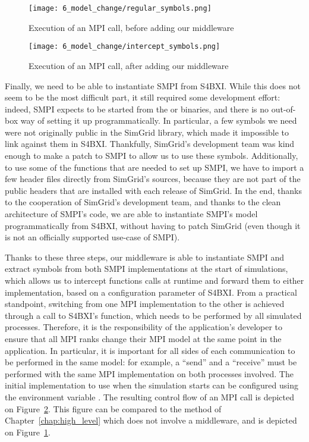 \begin{figure}[!b]
    \centering
    \texttt{[image: 6\_model\_change/regular\_symbols.png]}
    \caption{Execution of an MPI call, before adding our middleware}
    \label{fig:6_model_change:regular_symbols}
\end{figure}

\begin{figure}[!b]
    \centering
    \texttt{[image: 6\_model\_change/intercept\_symbols.png]}
    \caption{Execution of an MPI call, after adding our middleware}
    \label{fig:6_model_change:intercept_symbols}
\end{figure}

Finally, we need to be able to instantiate SMPI from S4BXI. While this does not
seem to be the most difficult part, it still required some development effort:
indeed, SMPI expects to be started from the  or
 binaries, and there is no out-of-box way of setting it up
programmatically. In particular, a few symbols we need were not originally
public in the SimGrid library, which made it impossible to link against them in
S4BXI. Thankfully, SimGrid's development team was kind enough to make a patch to
SMPI to allow us to use these symbols. Additionally, to use some of the
functions that are needed to set up SMPI, we have to import a few header files
directly from SimGrid's sources, because they are not part of the public headers
that are installed with each release of SimGrid. In the end, thanks to the
cooperation of SimGrid's development team, and thanks to the clean architecture
of SMPI's code, we are able to instantiate SMPI's model programmatically from
S4BXI, without having to patch SimGrid (even though it is not an officially
supported use-case of SMPI).

Thanks to these three steps, our middleware is able to instantiate SMPI and
extract symbols from both SMPI implementations at the start of simulations,
which allows us to intercept functions calls at runtime and forward them to
either implementation, based on a configuration parameter of S4BXI. From a
practical standpoint, switching from one MPI implementation to the other is
achieved through a call to S4BXI's  function,
which needs to be performed by all simulated processes. Therefore, it is the
responsibility of the application's developer to ensure that all MPI ranks
change their MPI model at the same point in the application. In particular, it
is important for all sides of each communication to be performed in the same
model: for example, a ``send'' and a ``receive'' must be performed with the same
MPI implementation on both processes involved. The initial implementation to use
when the simulation starts can be configured using the environment variable
. The resulting control flow of an MPI call is
depicted on Figure~\ref{fig:6_model_change:intercept_symbols}. This figure can
be compared to the method of Chapter~\ref{chap:high_level} which does not
involve a middleware, and is depicted on
Figure~\ref{fig:6_model_change:regular_symbols}.

